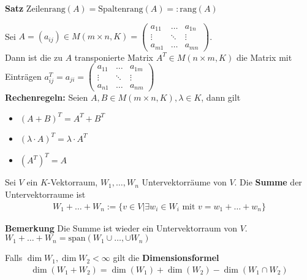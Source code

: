 \textbf{Satz} $\text{Zeilenrang}(A) = \text{Spaltenrang}(A) =: \text{rang}(A)$\\
\begin{mdframed}
Sei $A  = (a_{ij}) \in M(m\times n,K)  = 
\begin{pmatrix}
a_{11} & \ldots & a_{1n} \\
\vdots & \ddots & \vdots \\
a_{m1} & \ldots & a_{mn}
\end{pmatrix}$. \\
Dann ist die zu $A$ transponierte Matrix $A^T \in M(n\times m,K)$ die Matrix mit Einträgen $a_{ij}^T = a_{ji} = \begin{pmatrix}
a_{11} & \ldots & a_{1m} \\
\vdots & \ddots & \vdots \\
a_{n1} & \ldots & a_{nm}
\end{pmatrix}$\\
\textbf{Rechenregeln:} \quad Seien $A, B \in M(m\times n,K), \lambda \in K$, dann gilt
\begin{itemize}
    \item $(A + B)^T = A^T + B^T$
    
    \item $(\lambda \cdot A)^T = \lambda \cdot A^T$
    
    \item $(A^T)^T = A$
\end{itemize}
\end{mdframed}
\begin{mdframed}
Sei $V$ ein $K$-Vektorraum, $W_1, \ldots, W_n$ Untervektorräume von $V$. Die \textbf{Summe} der Untervektorraume ist
\begin{align*}
    W_{1} + \ldots + W_{n}:= \{v \in V \big\vert \exists w_i \in W_i \text{ mit } v = w_{1} + \ldots + w_{n}\}
\end{align*}
\end{mdframed}
\textbf{Bemerkung} Die Summe ist wieder ein Untervektorraum von $V$. \\$W_{1} + \ldots + W_{n} = \text{span}(W_1 \cup \ldots, \cup W_n)$\\
\begin{mdframed}
    Falls $\dim W_1, \dim W_2 < \infty$ gilt die \textbf{Dimensionsformel} 
    \begin{align*}
        \dim(W_1 + W_2) = \dim(W_1) + \dim(W_2) - \dim(W_1 \cap W_2)
    \end{align*}
\end{mdframed}
